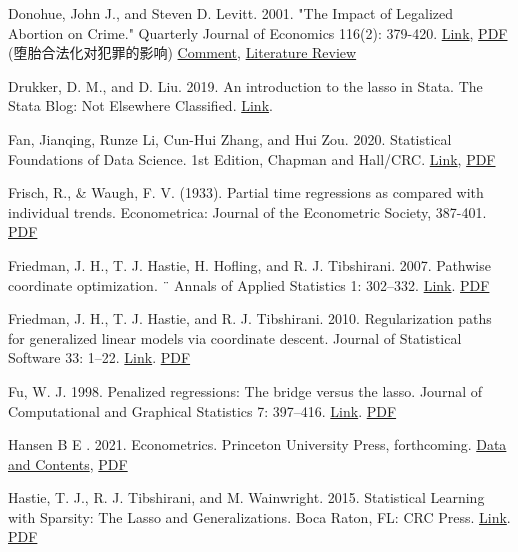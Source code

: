 {Donohue, John J., and Steven D. Levitt. 2001. "The Impact of Legalized Abortion on Crime." Quarterly Journal of Economics 116(2): 379-420. \href{https://doi.org/10.1162/00335530151144050}{Link}, \href{http://sci-hub.ren/10.1162/00335530151144050}{PDF} (堕胎合法化对犯罪的影响)
\href{http://sci-hub.ren/10.1162/qjec.2008.123.1.407}{Comment}, \href{http://sci-hub.ren/10.1093/aler/ahaa008}{Literature Review}

Drukker, D. M., and D. Liu. 2019. An introduction to the lasso in Stata. The Stata Blog: Not Elsewhere Classified.
\href{https://blog.stata.com/2019/09/09/an-introduction-to-the-lasso-in-stata/}{Link}.

Fan, Jianqing, Runze Li, Cun-Hui Zhang, and Hui Zou. 2020. Statistical Foundations of Data Science. 1st Edition, Chapman and Hall/CRC. \href{https://doi.org/10.1201/9780429096280}{Link}, \href{http://sci-hub.ren/10.1201/9780429096280}{PDF}

Frisch, R., \& Waugh, F. V. (1933). Partial time regressions as compared with individual trends. Econometrica: Journal of the Econometric Society, 387-401. \href{http://sci-hub.ren/10.2307/1907330}{PDF} 

Friedman, J. H., T. J. Hastie, H. Hofling, and R. J. Tibshirani. 2007. Pathwise coordinate optimization. ¨ Annals of
Applied Statistics 1: 302–332. \href{https://doi.org/10.1214/07-AOAS131}{Link}. \href{http://sci-hub.ren/10.1214/07-AOAS131}{PDF}

Friedman, J. H., T. J. Hastie, and R. J. Tibshirani. 2010. Regularization paths for generalized linear models via
coordinate descent. Journal of Statistical Software 33: 1–22. \href{https://doi.org/10.18637/jss.v033.i01}{Link}. \href{http://sci-hub.ren/10.18637/jss.v033.i01}{PDF}

Fu, W. J. 1998. Penalized regressions: The bridge versus the lasso. Journal of Computational and Graphical Statistics
7: 397–416. \href{https://doi.org/10.1080/10618600.1998.10474784}{Link}. \href{http://sci-hub.ren/10.1080/10618600.1998.10474784}{PDF}

Hansen B E . 2021. Econometrics. Princeton University Press, forthcoming. \href{https://www.ssc.wisc.edu/~bhansen/econometrics/}{Data and Contents}, \href{https://www.ssc.wisc.edu/~bhansen/econometrics/Econometrics.pdf}{PDF}

Hastie, T. J., R. J. Tibshirani, and M. Wainwright. 2015. Statistical Learning with Sparsity: The Lasso and
Generalizations. Boca Raton, FL: CRC Press. \href{https://web.stanford.edu/~hastie/StatLearnSparsity/}{Link}. \href{https://web.stanford.edu/~hastie/StatLearnSparsity_files/SLS.pdf}{PDF}

}
